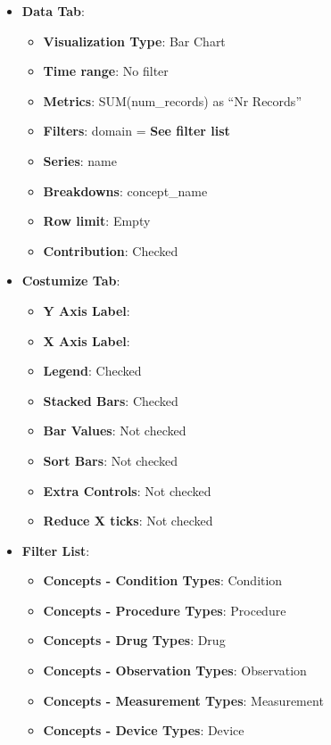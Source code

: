 \documentclass[
]{book}
\providecommand{\tightlist}{%
  \setlength{\itemsep}{0pt}\setlength{\parskip}{0pt}}
\begin{document}
\begin{itemize}
\tightlist
\item
  \textbf{Data Tab}:

  \begin{itemize}
  \tightlist
  \item
    \textbf{Visualization Type}: Bar Chart
  \item
    \textbf{Time range}: No filter
  \item
    \textbf{Metrics}: SUM(num\_records) as ``Nr Records''
  \item
    \textbf{Filters}: domain = \textbf{See filter list}
  \item
    \textbf{Series}: name
  \item
    \textbf{Breakdowns}: concept\_name
  \item
    \textbf{Row limit}: Empty
  \item
    \textbf{Contribution}: Checked
  \end{itemize}
\item
  \textbf{Costumize Tab}:

  \begin{itemize}
  \tightlist
  \item
    \textbf{Y Axis Label}:
  \item
    \textbf{X Axis Label}:
  \item
    \textbf{Legend}: Checked
  \item
    \textbf{Stacked Bars}: Checked
  \item
    \textbf{Bar Values}: Not checked
  \item
    \textbf{Sort Bars}: Not checked
  \item
    \textbf{Extra Controls}: Not checked
  \item
    \textbf{Reduce X ticks}: Not checked
  \end{itemize}
\item
  \textbf{Filter List}:

  \begin{itemize}
  \tightlist
  \item
    \textbf{Concepts - Condition Types}: Condition
  \item
    \textbf{Concepts - Procedure Types}: Procedure
  \item
    \textbf{Concepts - Drug Types}: Drug
  \item
    \textbf{Concepts - Observation Types}: Observation
  \item
    \textbf{Concepts - Measurement Types}: Measurement
  \item
    \textbf{Concepts - Device Types}: Device
  \end{itemize}
\end{itemize}
\end{document}

